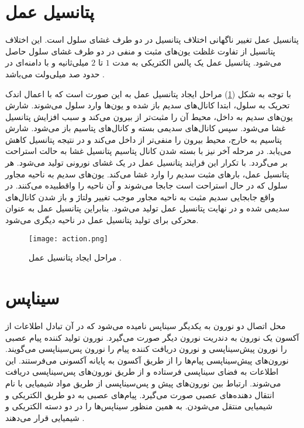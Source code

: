 
\section{ پتانسیل عمل }
پتانسیل عمل تغییر ناگهانی اختلاف پتانسیل در دو طرف غشای سلول است. این اختلاف پتانسیل از تفاوت غلظت یون‌های مثبت و منفی در دو طرف غشای سلول  حاصل می‌شود. پتانسیل عمل یک پالس الکتریکی به مدت $1$ تا $2$ میلی‌ثانیه و  با دامنه‌ای در حدود صد‌ میلی‌ولت می‌باشد \cite{ermen}. 

با توجه به شکل (\ref{fig:action}) مراحل ایجاد پتانسیل عمل به این صورت است که با اعمال اندک تحریک به سلول، ابتدا کانال‌های سدیم باز شده و یون‌ها وارد سلول می‌شوند. شارش یون‌های سدیم به داخل، محیط آن ‌را مثبت‌تر از بیرون می‌کند و سبب افزایش پتانسیل غشا می‌شود. سپس کانال‌های سدیمی بسته و کانال‌های پتاسیم باز می‌شود. شارش پتاسیم به خارج، محیط بیرون را منفی‌تر از داخل می‌کند و در نتیجه پتانسیل کاهش می‌یابد. در مرحله آخر نیز با بسته شدن کانال پتاسیم پتانسیل غشا به حالت استراحت بر می‌گردد. با تکرار این فرایند پتانسیل عمل در یک غشای نورونی تولید می‌شود. هر پتانسیل عمل، بار‌های مثبت سدیم را وارد غشا می‌کند. یون‌های سدیم به ناحیه مجاور سلول که در حال استراحت است جابجا می‌شوند و آن ناحیه را واقطبیده می‌کنند. در واقع جابجایی سدیم مثبت به ناحیه مجاور موجب تغییر ولتاژ و باز شدن کانال‌های سدیمی شده و در نهایت پتانسیل عمل تولید می‌شود. بنابراین پتانسیل عمل به عنوان محرکی برای تولید پتانسیل عمل در ناحیه دیگری می‌شود.
\begin{figure} [htbp]
\centering
\texttt{[image: action.png]} 
\caption[مراحل ایجاد پتانسیل عمل] {\footnotesize مراحل ایجاد پتانسیل عمل \cite{ermen}.}
\label{fig:action}
\end{figure}
\section{ سیناپس }
محل اتصال دو نورون به یکدیگر سیناپس نامیده می‌شود که در آن تبادل اطلاعات از آکسون یک نورون به دندریت نورون دیگر صورت می‌گیرد. نورون  تولید کننده پیام عصبی را نورون پیش‌سیناپسی و نورون  دریافت کننده پیام را نورون پس‌سیناپسی  می‌گویند.  نورون‌های پیش‌سیناپسی پیام‌ها را از طریق آکسون به پایانه آکسونی می‌فرستند. این اطلاعات به فضای سیناپسی فرستاده و از طریق نورون‌های پس‌سیناپسی دریافت می‌شوند. ارتباط بین نورون‌های پیش‌ و پس‌سیناپسی از طریق مواد شیمیایی با نام انتقال دهنده‌های عصبی صورت می‌گیرد. پیام‌های عصبی به دو طریق الکتریکی و شیمیایی منتقل می‌شودن. به همین منظور سیناپس‌ها را در دو دسته  الکتریکی و شیمیایی قرار می‌دهند \cite{kandel} .
 
